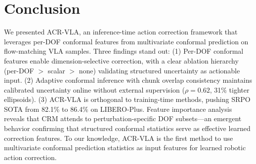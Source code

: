 \documentclass[10pt,letterpaper]{article}
\newcommand{\ours}{ACR-VLA}
\newcommand{\crm}{CRM}
\begin{document}
\section{Conclusion}
\label{sec:conclusion}

We presented \ours{}, an inference-time action correction framework that leverages per-DOF conformal features from multivariate conformal prediction on flow-matching VLA samples.
Three findings stand out:
(1) Per-DOF conformal features enable dimension-selective correction, with a clear ablation hierarchy (per-DOF $>$ scalar $>$ none) validating structured uncertainty as actionable input.
(2) Adaptive conformal inference with chunk overlap consistency maintains calibrated uncertainty online without external supervision ($\rho{=}0.62$, 31\% tighter ellipsoids).
(3) \ours{} is orthogonal to training-time methods, pushing SRPO SOTA from 82.1\% to 86.4\% on LIBERO-Plus.
Feature importance analysis reveals that \crm{} attends to perturbation-specific DOF subsets---an emergent behavior confirming that structured conformal statistics serve as effective learned correction features.
To our knowledge, \ours{} is the first method to use multivariate conformal prediction statistics as input features for learned robotic action correction.
\end{document}
